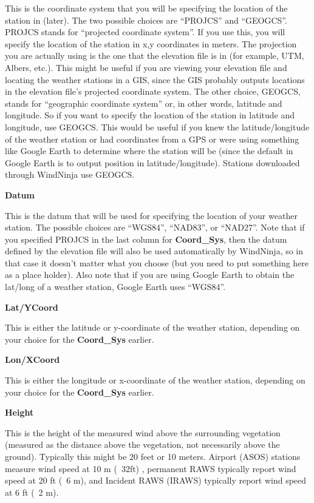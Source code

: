 \documentclass[12pt]{article}
\begin{document}
This is the coordinate system that you will be specifying the location of the station in (later).  The two possible choices are “PROJCS” and “GEOGCS”.  PROJCS stands for “projected coordinate system”.  If you use this, you will specify the location of the station in x,y coordinates in meters.  The projection you are actually using is the one that the elevation file is in (for example, UTM, Albers, etc.).  This might be useful if you are viewing your elevation file and locating the weather stations in a GIS, since the GIS probably outputs locations in the elevation file's projected coordinate system.  The other choice, GEOGCS, stands for “geographic coordinate system” or, in other words, latitude and longitude.  So if you want to specify the location of the station in latitude and longitude, use GEOGCS.  This would be useful if you knew the latitude/longitude of the weather station or had coordinates from a GPS or were using something like Google Earth to determine where the station will be (since the default in Google Earth is to output position in latitude/longitude). Stations downloaded through WindNinja use GEOGCS.

\textbf{Datum}

This is the datum that will be used for specifying the location of your weather station.  The possible choices are “WGS84”, “NAD83”, or “NAD27”.  Note that if you specified PROJCS in the last column for \textbf{Coord\_Sys}, then the datum defined by the elevation file will also be used automatically by WindNinja, so in that case it doesn't matter what you choose (but you need to put something here as a place holder).  Also note that if you are using Google Earth to obtain the lat/long of a weather station, Google Earth uses “WGS84”.

\textbf{Lat/YCoord}

This is either the latitude or y-coordinate of the weather station, depending on your choice for the \textbf{Coord\_Sys} earlier.

\textbf{Lon/XCoord}

This is either the longitude or x-coordinate of the weather station, depending on your choice for the \textbf{Coord\_Sys} earlier.

\textbf{Height}

This is the height of the measured wind above the surrounding vegetation (measured as the distance above the vegetation, not necessarily above the ground).  Typically this might be 20 feet or 10 meters. Airport (ASOS) stations measure wind speed at 10 m (~32ft) , permanent RAWS typically report wind speed at 20 ft (~6 m), and Incident RAWS (IRAWS) typically report wind speed at 6 ft (~2 m).
\end{document}
